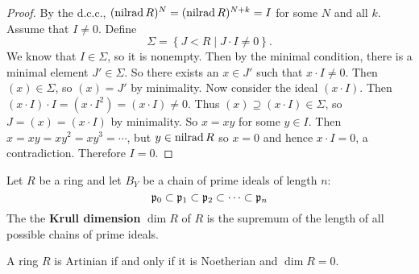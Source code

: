\begin{proof}
  By the d.c.c., $(\operatorname{nilrad} R)^N=(\operatorname{nilrad} R)^{N+k}=I$ for some $N$ and all $k$.
  Assume that $I \neq 0$.
  Define
  \[ \Sigma = \left\{ J < R \mid J \cdot I \neq 0 \right\}. \]
  We know that $I \in \Sigma$, so it is nonempty.
  Then by the minimal condition, there is a minimal element $J' \in \Sigma$.
  So there exists an $x \in J'$ such that $x \cdot I \neq 0$.
  Then $(x) \in \Sigma$, so $(x)=J'$ by minimality.
  Now consider the ideal $(x \cdot I)$.
  Then $(x \cdot I) \cdot I = (x \cdot I^2) = (x \cdot I) \neq 0$.
  Thus $(x) \supseteq (x \cdot I) \in \Sigma$, so $J = (x) = (x \cdot I)$ by minimality.
  So $x=xy$ for some $y \in I$.
  Then $x=xy=xy^2=xy^3=\cdots$, but $y \in \operatorname{nilrad} R$ so $x=0$ and hence $x \cdot I = 0$, a contradiction.
  Therefore $I=0$.
\end{proof}

\begin{defn}[3.35]
  Let $R$ be a ring and let $B_Y$ be a chain of prime ideals of length $n$:
  \[ \mathfrak{p}_0 \subset \mathfrak{p}_1 \subset \mathfrak{p}_2 \subset \cdots \subset \mathfrak{p}_n \]
  The the \textbf{Krull dimension} $\dim R$ of $R$ is the supremum of the length of all possible chains of prime ideals.
\end{defn}

\begin{thm}[3.36]
  A ring $R$ is Artinian if and only if it is Noetherian and $\dim R=0$.
\end{thm}
